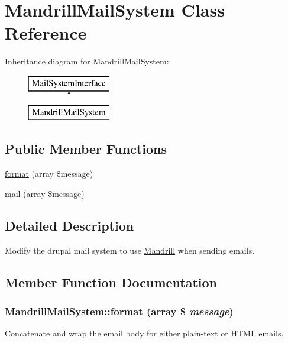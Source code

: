 \hypertarget{classMandrillMailSystem}{
\section{MandrillMailSystem Class Reference}
\label{classMandrillMailSystem}
}
Inheritance diagram for MandrillMailSystem::\begin{figure}[H]
\begin{center}
\leavevmode
\includegraphics[height=2cm]{classMandrillMailSystem}
\end{center}
\end{figure}
\subsection*{Public Member Functions}
\begin{DoxyCompactItemize}
\item 
\hyperlink{classMandrillMailSystem_a4e7e619d5560224017ccc438c31e40d6}{format} (array \$message)
\item 
\hyperlink{classMandrillMailSystem_a2d56986dfa5ce08e134344078710cf23}{mail} (array \$message)
\end{DoxyCompactItemize}


\subsection{Detailed Description}
Modify the drupal mail system to use \hyperlink{classMandrill}{Mandrill} when sending emails. 

\subsection{Member Function Documentation}
\hypertarget{classMandrillMailSystem_a4e7e619d5560224017ccc438c31e40d6}{
\subsubsection[{format}]{\setlength{\rightskip}{0pt plus 5cm}MandrillMailSystem::format (array \$ {\em message})}}
\label{classMandrillMailSystem_a4e7e619d5560224017ccc438c31e40d6}
Concatenate and wrap the email body for either plain-\/text or HTML emails.


